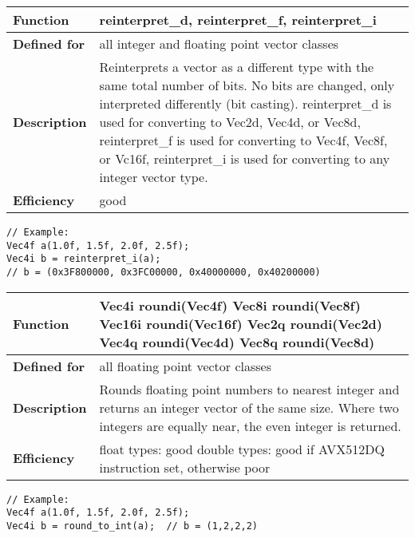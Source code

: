 \documentclass[vcl_manual.tex]{subfiles}
\begin{document}
\begin{tabular}{|p{30mm}|p{120mm}|}
\hline
\bfseries Function & reinterpret\_d, reinterpret\_f, reinterpret\_i \\ \hline
\bfseries Defined for & all integer and floating point vector classes \\ \hline
\bfseries Description & Reinterprets a vector as a different type with the same total number of bits. No bits are changed, only interpreted differently (bit casting).\newline
reinterpret\_d is used for converting to Vec2d, Vec4d, or Vec8d, \newline
reinterpret\_f is used for converting to Vec4f, Vec8f, or Vc16f, \newline
reinterpret\_i is used for converting to any integer vector type. \\ \hline
\bfseries Efficiency & good \\ \hline
\end{tabular}
\begin{lstlisting}[frame=none]
// Example:
Vec4f a(1.0f, 1.5f, 2.0f, 2.5f);
Vec4i b = reinterpret_i(a); 
// b = (0x3F800000, 0x3FC00000, 0x40000000, 0x40200000)
\end{lstlisting}

\label{roundToInt}
\begin{tabular}{|p{30mm}|p{120mm}|}
\hline
\bfseries Function & 
Vec4i roundi(Vec4f) \newline
Vec8i roundi(Vec8f) \newline
Vec16i roundi(Vec16f) \newline
Vec2q roundi(Vec2d) \newline
Vec4q roundi(Vec4d) \newline
Vec8q roundi(Vec8d) \\ \hline
\bfseries Defined for & all floating point vector classes \\ \hline
\bfseries Description & Rounds floating point numbers to nearest integer and returns an integer vector of the same size. Where two integers are equally near, the even integer is returned. \\ \hline
\bfseries Efficiency & float types: good \newline
double types: good if AVX512DQ instruction set, otherwise poor \\ \hline
\end{tabular}
\begin{lstlisting}[frame=none]
// Example:
Vec4f a(1.0f, 1.5f, 2.0f, 2.5f);
Vec4i b = round_to_int(a);  // b = (1,2,2,2)
\end{lstlisting}
\end{document}
